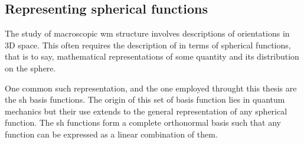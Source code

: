 
\subsection{Representing spherical functions}


The study of macroscopic \gls{wm} structure involves descriptions of orientations in 3D space.
This often requires the description of in terms of spherical functions, that is to say, mathematical representations of some quantity and its distribution on the sphere.

One common such representation, and the one employed throught this thesis are the \gls{sh} basis functions.
The origin of this set of basis function lies in quantum mechanics  but their use extends to the general representation of any spherical function.
The \gls{sh} functions form a complete orthonormal basis such that any  function can be expressed as a linear combination of them.

